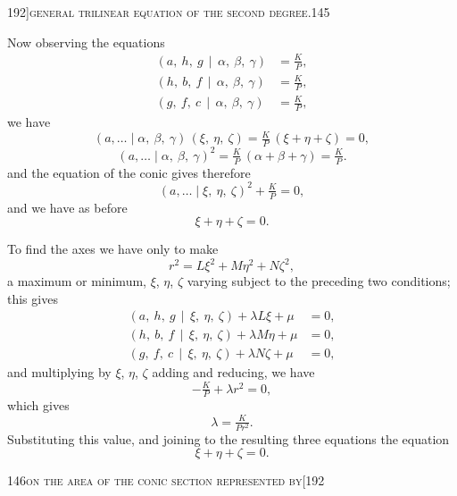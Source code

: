 \documentclass[11pt]{article}
\begin{document}
\newpage

\begin{center}
\small 192]\hfill\textsc{general trilinear equation of the second degree.}\hfill\textsc{145}
\end{center}

\medskip

\noindent Now observing the equations
\begin{align*}
(a,\ h,\ g\,\mid\,\alpha,\ \beta,\ \gamma) &= \tfrac{K}{P}, \\
(h,\ b,\ f\,\mid\,\alpha,\ \beta,\ \gamma) &= \tfrac{K}{P}, \\
(g,\ f,\ c\,\mid\,\alpha,\ \beta,\ \gamma) &= \tfrac{K}{P},
\end{align*}
we have
\[
(a,\ldots \mid \alpha,\ \beta,\ \gamma)\,(\xi,\ \eta,\ \zeta) = \tfrac{K}{P}\,(\xi + \eta + \zeta) = 0,
\]
\[
(a,\ldots \mid \alpha,\ \beta,\ \gamma)^{2} = \tfrac{K}{P}\,(\alpha + \beta + \gamma) = \tfrac{K}{P}.
\]
and the equation of the conic gives therefore
\[
(a,\ldots \mid \xi,\ \eta,\ \zeta)^{2} + \tfrac{K}{P} = 0,
\]
and we have as before
\[
\xi + \eta + \zeta = 0.
\]

To find the axes we have only to make
\[
r^{2} = L\xi^{2} + M\eta^{2} + N\zeta^{2},
\]
a maximum or minimum, $\xi$, $\eta$, $\zeta$ varying subject to the preceding two conditions; this gives
\begin{align*}
(a,\ h,\ g\,\mid\,\xi,\ \eta,\ \zeta) + \lambda L\xi + \mu &= 0, \\
(h,\ b,\ f\,\mid\,\xi,\ \eta,\ \zeta) + \lambda M\eta + \mu &= 0, \\
(g,\ f,\ c\,\mid\,\xi,\ \eta,\ \zeta) + \lambda N\zeta + \mu &= 0,
\end{align*}
and multiplying by $\xi$, $\eta$, $\zeta$ adding and reducing, we have
\[
-\tfrac{K}{P} + \lambda r^{2} = 0,
\]
which gives
\[
\lambda = \tfrac{K}{P r^{2}}.
\]
Substituting this value, and joining to the resulting three equations the equation
\[
\xi + \eta + \zeta = 0.
\]

\newpage

\begin{center}
\small 146\hfill\textsc{on the area of the conic section represented by}\hfill[192
\end{center}
\end{document}
